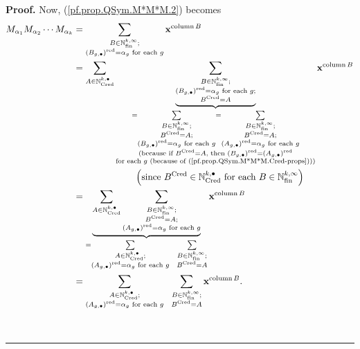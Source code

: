 \documentclass
[numbers=enddot,12pt,final,onecolumn,notitlepage,abstracton]{scrartcl}%
\theoremstyle{definition}
\newenvironment{proof}[1][Proof]{\noindent\textbf{#1.} }{\ \rule{0.5em}{0.5em}}
\let\sumnonlimits\sum
\renewcommand{\sum}{\sumnonlimits\limits}
\begin{document}
\begin{proof}
Now, (\ref{pf.prop.QSym.M*M*M.2}) becomes%
\begin{align}
M_{\alpha_{1}}M_{\alpha_{2}}\cdots M_{\alpha_{k}}  &  =\sum_{\substack{B\in
\mathbb{N}_{\operatorname*{fin}}^{k,\infty};\\\left(  B_{g,\bullet}\right)
^{\operatorname*{red}}=\alpha_{g}\text{ for each }g}}\mathbf{x}%
^{\operatorname*{column}B}\nonumber\\
&  =\sum_{A\in\mathbb{N}_{\operatorname*{Cred}}^{k,\bullet}}\underbrace{\sum
_{\substack{B\in\mathbb{N}_{\operatorname*{fin}}^{k,\infty};\\\left(
B_{g,\bullet}\right)  ^{\operatorname*{red}}=\alpha_{g}\text{ for each
}g;\\B^{\operatorname*{Cred}}=A}}}_{\substack{=\sum_{\substack{B\in
\mathbb{N}_{\operatorname*{fin}}^{k,\infty};\\B^{\operatorname*{Cred}%
}=A;\\\left(  B_{g,\bullet}\right)  ^{\operatorname*{red}}=\alpha_{g}\text{
for each }g}}=\sum_{\substack{B\in\mathbb{N}_{\operatorname*{fin}}^{k,\infty
};\\B^{\operatorname*{Cred}}=A;\\\left(  A_{g,\bullet}\right)
^{\operatorname*{red}}=\alpha_{g}\text{ for each }g}}\\\text{(because if
}B^{\operatorname*{Cred}}=A\text{, then }\left(  B_{g,\bullet}\right)
^{\operatorname*{red}}=\left(  A_{g,\bullet}\right)  ^{\operatorname*{red}%
}\\\text{for each }g\text{ (because of (\ref{pf.prop.QSym.M*M*M.Cred-props}%
)))}}}\mathbf{x}^{\operatorname*{column}B}\nonumber\\
&  \ \ \ \ \ \ \ \ \ \ \ \ \ \ \ \ \ \ \ \ \left(  \text{since }%
B^{\operatorname*{Cred}}\in\mathbb{N}_{\operatorname*{Cred}}^{k,\bullet}\text{
for each }B\in\mathbb{N}_{\operatorname*{fin}}^{k,\infty}\right) \nonumber\\
&  =\underbrace{\sum_{A\in\mathbb{N}_{\operatorname*{Cred}}^{k,\bullet}}%
\sum_{\substack{B\in\mathbb{N}_{\operatorname*{fin}}^{k,\infty}%
;\\B^{\operatorname*{Cred}}=A;\\\left(  A_{g,\bullet}\right)
^{\operatorname*{red}}=\alpha_{g}\text{ for each }g}}}_{=\sum_{\substack{A\in
\mathbb{N}_{\operatorname*{Cred}}^{k,\bullet};\\\left(  A_{g,\bullet}\right)
^{\operatorname*{red}}=\alpha_{g}\text{ for each }g}}\ \ \sum_{\substack{B\in
\mathbb{N}_{\operatorname*{fin}}^{k,\infty};\\B^{\operatorname*{Cred}}=A}%
}}\mathbf{x}^{\operatorname*{column}B}\nonumber\\
&  =\sum_{\substack{A\in\mathbb{N}_{\operatorname*{Cred}}^{k,\bullet
};\\\left(  A_{g,\bullet}\right)  ^{\operatorname*{red}}=\alpha_{g}\text{ for
each }g}}\ \ \sum_{\substack{B\in\mathbb{N}_{\operatorname*{fin}}^{k,\infty
};\\B^{\operatorname*{Cred}}=A}}\mathbf{x}^{\operatorname*{column}B}.
\label{pf.prop.QSym.M*M*M.5}%
\end{align}



\end{proof}
\end{document}
